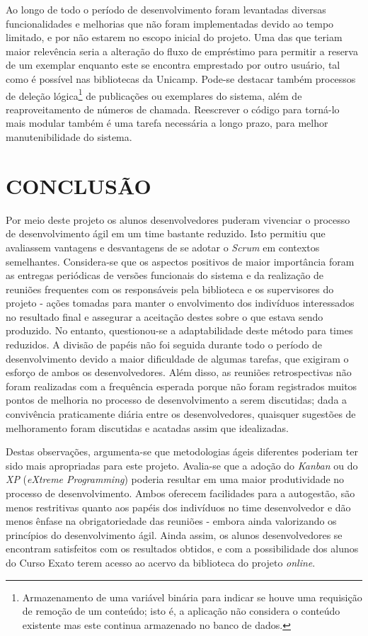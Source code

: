 \documentclass[a4paper]{article}
\begin{document}
Ao longo de todo o período de desenvolvimento foram levantadas diversas funcionalidades e melhorias que não foram implementadas devido ao tempo limitado, e por não estarem no escopo inicial do projeto. Uma das que teriam maior relevência seria a alteração do fluxo de empréstimo para permitir a reserva de um exemplar enquanto este se encontra emprestado por outro usuário, tal como é possível nas bibliotecas da Unicamp. Pode-se destacar também processos de deleção lógica\footnote{Armazenamento de uma variável binária para indicar se houve uma requisição de remoção de um conteúdo; isto é, a aplicação não considera o conteúdo existente mas este continua armazenado no banco de dados.} de publicações ou exemplares do sistema, além de reaproveitamento de números de chamada. Reescrever o código para torná-lo mais modular também é uma tarefa necessária a longo prazo, para melhor manutenibilidade do sistema.

\pagebreak
\section{CONCLUSÃO}
Por meio deste projeto os alunos desenvolvedores puderam vivenciar o processo de desenvolvimento ágil em um time bastante reduzido. Isto permitiu que avaliassem vantagens e desvantagens de se adotar o \textit{Scrum} em contextos semelhantes. Considera-se que os aspectos positivos de maior importância foram as entregas periódicas de versões funcionais do sistema e da realização de reuniões frequentes com os responsáveis pela biblioteca e os supervisores do projeto - ações tomadas para manter o envolvimento dos indivíduos interessados no resultado final e assegurar a aceitação destes sobre o que estava sendo produzido. No entanto, questionou-se a adaptabilidade deste método para times reduzidos. A divisão de papéis não foi seguida durante todo o período de desenvolvimento devido a maior dificuldade de algumas tarefas, que exigiram o esforço de ambos os desenvolvedores. Além disso, as reuniões retrospectivas não foram realizadas com a frequência esperada porque não foram registrados muitos pontos de melhoria no processo de desenvolvimento a serem discutidas; dada a convivência praticamente diária entre os desenvolvedores, quaisquer sugestões de melhoramento foram discutidas e acatadas assim que idealizadas.

Destas observações, argumenta-se que metodologias ágeis diferentes poderiam ter sido mais apropriadas para este projeto. Avalia-se que a adoção do \textit{Kanban} \cite{kanban} ou do \textit{XP} (\textit{eXtreme Programming}) \cite{xp} poderia resultar em uma maior produtividade no processo de desenvolvimento. Ambos oferecem facilidades para a autogestão, são menos restritivas quanto aos papéis dos indivíduos no time desenvolvedor e dão menos ênfase na obrigatoriedade das reuniões - embora ainda valorizando os princípios do desenvolvimento ágil. Ainda assim, os alunos desenvolvedores se encontram satisfeitos com os resultados obtidos, e com a possibilidade dos alunos do Curso Exato terem acesso ao acervo da biblioteca do projeto \textit{online}.
\end{document}
